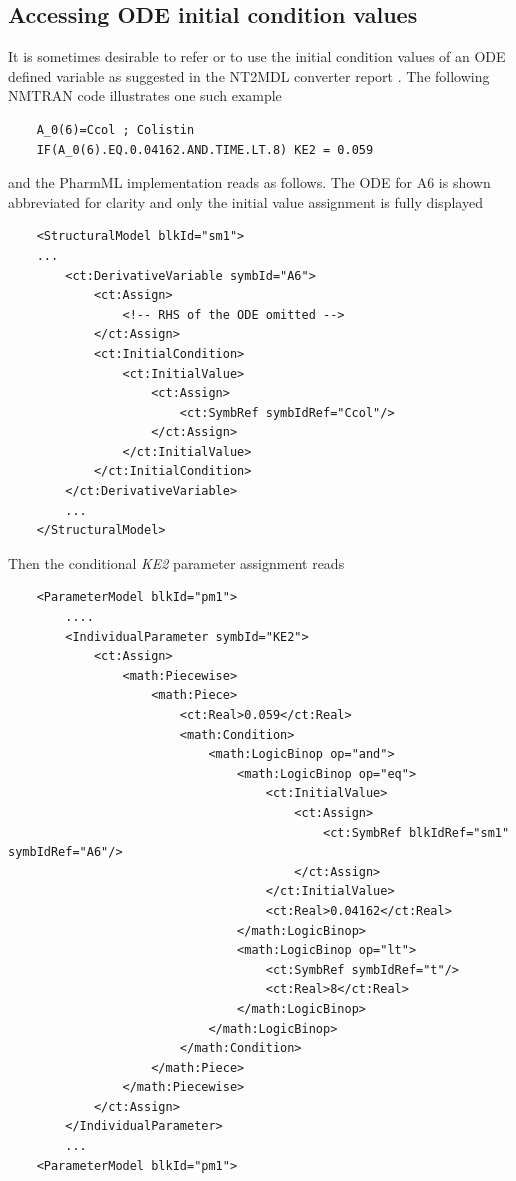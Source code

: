 \subsection{Accessing ODE initial condition values}
\label{subsec:initialValue}
It is sometimes desirable to refer or to use the initial condition values 
of an ODE defined variable as suggested in the NT2MDL converter 
report \cite{nt2mdl:2016}. The following NMTRAN code illustrates 
one such example
\lstset{language=NM}
\begin{lstlisting}
	A_0(6)=Ccol ; Colistin	
	IF(A_0(6).EQ.0.04162.AND.TIME.LT.8) KE2 = 0.059
\end{lstlisting}
and the PharmML implementation reads as follows. 
The ODE for A6 is shown abbreviated for clarity and only the 
initial value assignment is fully displayed 
\lstset{language=XML}
\begin{lstlisting}
    <StructuralModel blkId="sm1">
	...
        <ct:DerivativeVariable symbId="A6">
            <ct:Assign>
                <!-- RHS of the ODE omitted -->
            </ct:Assign>
            <ct:InitialCondition>
                <ct:InitialValue>
                    <ct:Assign>
                        <ct:SymbRef symbIdRef="Ccol"/>
                    </ct:Assign>
                </ct:InitialValue>
            </ct:InitialCondition>
        </ct:DerivativeVariable>
        ...
    </StructuralModel>
\end{lstlisting}
Then the conditional \emph{KE2} parameter assignment reads
\lstset{language=XML}
\begin{lstlisting}
    <ParameterModel blkId="pm1">
    	....
        <IndividualParameter symbId="KE2">
            <ct:Assign>
                <math:Piecewise>
                    <math:Piece>
                        <ct:Real>0.059</ct:Real>
                        <math:Condition>
                            <math:LogicBinop op="and">
                                <math:LogicBinop op="eq">
                                    <ct:InitialValue>
                                        <ct:Assign>
                                            <ct:SymbRef blkIdRef="sm1" symbIdRef="A6"/>
                                        </ct:Assign>
                                    </ct:InitialValue>
                                    <ct:Real>0.04162</ct:Real>
                                </math:LogicBinop>
                                <math:LogicBinop op="lt">
                                    <ct:SymbRef symbIdRef="t"/>
                                    <ct:Real>8</ct:Real>
                                </math:LogicBinop>
                            </math:LogicBinop>
                        </math:Condition>
                    </math:Piece>
                </math:Piecewise>
            </ct:Assign>
        </IndividualParameter>
        ...
    <ParameterModel blkId="pm1">
\end{lstlisting}


